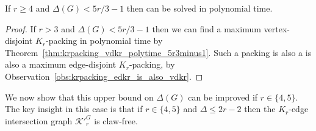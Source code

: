 \begin{thm}
\label{thm:krpacking_edkrgeq6_polytime}
If $r \geq 4$ and $\Delta(G) < 5r/3 - 1$ then \edkr can be solved in polynomial time.
\end{thm}
\begin{proof}
If $r > 3$ and $\Delta(G) < 5r/3 - 1$ then we can find a maximum vertex-disjoint $K_r$-packing in polynomial time by Theorem~\ref{thm:krpacking_vdkr_polytime_5r3minus1}. Such a packing is also a is also a maximum edge-disjoint $K_r$-packing, by Observation~\ref{obs:krpacking_edkr_is_also_vdkr}.
\end{proof}

We now show that this upper bound on $\Delta(G)$ can be improved if $r \in \{ 4, 5 \}$. The key insight in this case is that if $r \in \{ 4, 5 \}$ and $\Delta \leq 2r - 2$ then the $K_r$-edge intersection graph ${\mathcal{K}'}_r^G$ is claw-free.

